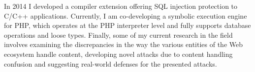 \begin{cvparagraph}

In 2014 I developed a compiler extension offering SQL injection protection to
C/C++ applications. Currently, I am co-developing a symbolic execution
engine for PHP, which operates at the PHP interpreter level and fully supports
database operations and loose types. Finally, some of my
current research in the field involves examining the discrepancies in the
way the various entities of the Web ecosystem handle content, developing novel
attacks due to content handling confusion and suggesting real-world defenses
for the presented attacks.
\end{cvparagraph}

